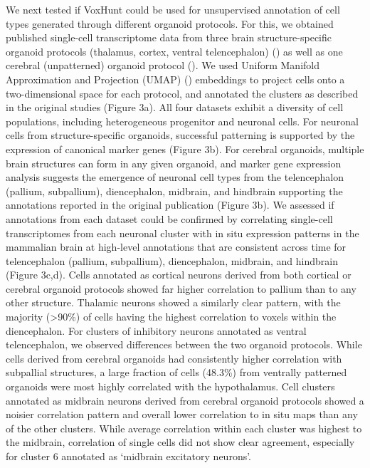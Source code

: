 We next tested if VoxHunt could be used for unsupervised annotation of cell types generated through different organoid protocols. For this, we obtained published single-cell transcriptome data from three brain structure-specific organoid protocols (thalamus, cortex, ventral telencephalon) (\cite{birey_assembly_2017,xiang_hesc-derived_2019}) as well as one cerebral (unpatterned) organoid protocol (\cite{kanton_organoid_2019}). We used Uniform Manifold Approximation and Projection (UMAP) (\cite{becht_dimensionality_2019}) embeddings to project cells onto a two-dimensional space for each protocol, and annotated the clusters as described in the original studies (Figure 3a). All four datasets exhibit a diversity of cell populations, including heterogeneous progenitor and neuronal cells. For neuronal cells from structure-specific organoids, successful patterning is supported by the expression of canonical marker genes (Figure 3b). For cerebral organoids, multiple brain structures can form in any given organoid, and marker gene expression analysis suggests the emergence of neuronal cell types from the telencephalon (pallium, subpallium), diencephalon, midbrain, and hindbrain supporting the annotations reported in the original publication (Figure 3b). We assessed if annotations from each dataset could be confirmed by correlating single-cell transcriptomes from each neuronal cluster with in situ expression patterns in the mammalian brain at high-level annotations that are consistent across time for telencephalon (pallium, subpallium), diencephalon, midbrain, and hindbrain (Figure 3c,d). Cells annotated as cortical neurons derived from both cortical or cerebral organoid protocols showed far higher correlation to pallium than to any other structure. Thalamic neurons showed a similarly clear pattern, with the majority (>90\%) of cells having the highest correlation to voxels within the diencephalon. For clusters of inhibitory neurons annotated as ventral telencephalon, we observed differences between the two organoid protocols. While cells derived from cerebral organoids had consistently higher correlation with subpallial structures, a large fraction of cells (48.3\%) from ventrally patterned organoids were most highly correlated with the hypothalamus. Cell clusters annotated as midbrain neurons derived from cerebral organoid protocols showed a noisier correlation pattern and overall lower correlation to in situ maps than any of the other clusters. While average correlation within each cluster was highest to the midbrain, correlation of single cells did not show clear agreement, especially for cluster 6 annotated as ‘midbrain excitatory neurons’.

